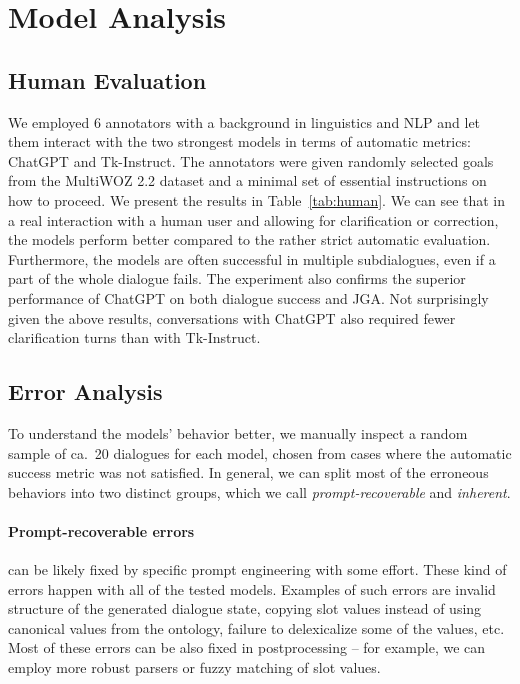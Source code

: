 \section{Model Analysis}
\label{07:sec:analysis}


\subsection{Human Evaluation}
\label{07:sec:human}
We employed 6 annotators with a background in linguistics and NLP and let them interact with the two strongest models in terms of automatic metrics: ChatGPT and Tk-Instruct.
The annotators were given randomly selected goals from the MultiWOZ 2.2 dataset and a minimal set of essential instructions on how to proceed.
We present the results in Table~\ref{tab:human}.
We can see that in a real interaction with a human user and allowing for clarification or correction, the models perform better compared to the rather strict automatic evaluation.
Furthermore, the models are often successful in multiple subdialogues, even if a part of the whole dialogue fails.
The experiment also confirms the superior performance of ChatGPT on both dialogue success and JGA.
Not surprisingly given the above results, conversations with ChatGPT also required fewer clarification turns than with Tk-Instruct.

\subsection{Error Analysis}

To understand the models' behavior better, we manually inspect a random sample of ca.~20 dialogues for each model, chosen from cases where the automatic success metric was not satisfied. 
In general, we can split most of the erroneous behaviors into two distinct groups, which we call \emph{prompt-recoverable} and \emph{inherent}.

\paragraph{Prompt-recoverable errors} can be likely fixed by specific prompt engineering with some effort.
These kind of errors happen with all of the tested models.
Examples of such errors are invalid structure of the generated dialogue state, copying slot values instead of using canonical values from the ontology, failure to delexicalize some of the values, etc.
Most of these errors can be also fixed in postprocessing -- for example, we can employ more robust parsers or fuzzy matching of slot values.

